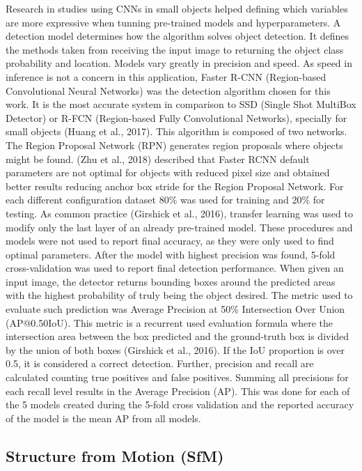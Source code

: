 \documentclass{article}
\begin{document}
Research in studies using CNNs in small objects helped defining which variables are more expressive when tunning pre-trained models and hyperparameters. A detection model determines how the algorithm solves object detection. It defines the methods taken from receiving the input image to returning the object class probability and location. Models vary greatly in precision and speed. As speed in inference is not a concern in this application, Faster R-CNN (Region-based Convolutional Neural Networks) was the detection algorithm chosen for this work. It is the most accurate system in comparison to SSD (Single Shot MultiBox Detector) or R-FCN (Region-based Fully Convolutional Networks), specially for small objects (Huang et al., 2017). This algorithm is composed of two networks. The Region Proposal Network (RPN) generates region proposals where objects might be found. (Zhu et al., 2018) described that Faster RCNN default parameters are not optimal for objects with reduced pixel size and obtained better results reducing anchor box stride for the Region Proposal Network.
For each different configuration dataset  80\% was used for training and 20\% for testing. As common practice (Girshick et al., 2016), transfer learning was used to modify only the last layer of an already pre-trained model. These procedures and models were not used to report final accuracy, as they were only used to find optimal parameters. After the model with highest precision was found, 5-fold cross-validation was used to report final detection performance. When given an input image, the detector returns bounding boxes around the predicted areas with the highest probability of truly being the object desired. The metric used to evaluate such prediction was Average Precision at 50\% Intersection Over Union (AP@0.50IoU). This metric is a recurrent used evaluation formula where the intersection area between the box predicted and the ground-truth box is divided by the union of both boxes (Girshick et al., 2016). If the IoU proportion is over 0.5, it is considered a correct detection. Further, precision and recall are calculated counting true positives and false positives. Summing all precisions for each recall level results in the Average Precision (AP). This was done for each of the 5 models created during the 5-fold cross validation and the reported accuracy of the model is the mean AP from all models.


\subsection{Structure from Motion (SfM)}
\label{sec:sfm}
\end{document}
